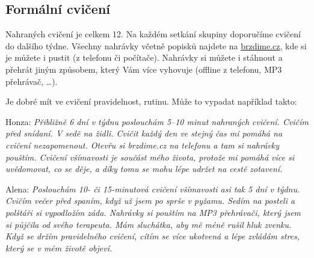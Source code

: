 \subsection{Formální cvičení}
		Nahraných cvičení je celkem 12. Na každém setkání skupiny doporučíme cvičení do dalšího týdne. Všechny nahrávky včetně popisků najdete na \href{https://brzdime.cz}{brzdime.cz}, kde si je můžete i pustit (z telefonu či počítače). Nahrávky si můžete i stáhnout a přehrát jiným způsobem, který Vám více vyhovuje (offline z telefonu, MP3 přehrávač, …).

		Je dobré mít ve cvičení pravidelnost, rutinu. Může to vypadat například takto:
		\begin{description*}
			\item[Honza:] \emph{Přibližně 6 dní v týdnu poslouchám 5–10 minut nahraných cvičení. Cvičím před snídaní. V sedě na židli. Cvičit každý den ve stejný čas mi pomáhá na cvičení nezapomenout. Otevřu si brzdime.cz na telefonu a tam si nahrávky pouštím. Cvičení všímavosti je součást mého života, protože mi pomáhá více si uvědomovat, co se děje, a díky tomu se mohu lépe udržet na cestě zotavení.}
			\item[Alena:] \emph{Poslouchám 10- či 15-minutová cvičení všímavosti asi tak 5 dní v týdnu. Cvičím večer před spaním, když už jsem po sprše v pyžamu. Sedím na posteli a polštáři si vypodložím záda. Nahrávky si pouštím na MP3 přehrávači, který jsem si půjčila od svého terapeuta. Mám sluchátka, aby mě méně rušil hluk zvenku. Když se držím pravidelného cvičení, cítím se více ukotvená a lépe zvládám stres, který se v mém životě objeví.}
		\end{description*}
